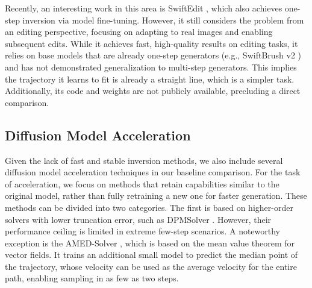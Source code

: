 \documentclass{article}
\begin{document}
Recently, an interesting work in this area is SwiftEdit \citep{swiftedit2025}, which also achieves one-step inversion via model fine-tuning. However, it still considers the problem from an editing perspective, focusing on adapting to real images and enabling subsequent edits. While it achieves fast, high-quality results on editing tasks, it relies on base models that are already one-step generators (e.g., SwiftBrush v2 \citep{swiftbrush2024}) and has not demonstrated generalization to multi-step generators. This implies the trajectory it learns to fit is already a straight line, which is a simpler task. Additionally, its code and weights are not publicly available, precluding a direct comparison.

\subsection{Diffusion Model Acceleration}
Given the lack of fast and stable inversion methods, we also include several diffusion model acceleration techniques in our baseline comparison. For the task of acceleration, we focus on methods that retain capabilities similar to the original model, rather than fully retraining a new one for faster generation. These methods can be divided into two categories. The first is based on higher-order solvers with lower truncation error, such as DPMSolver \citep{dpm_2022}. However, their performance ceiling is limited in extreme few-step scenarios. A noteworthy exception is the AMED-Solver \citep{amed2024}, which is based on the mean value theorem for vector fields. It trains an additional small model to predict the median point of the trajectory, whose velocity can be used as the average velocity for the entire path, enabling sampling in as few as two steps.
\end{document}
